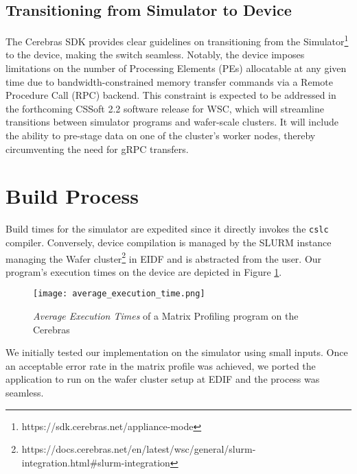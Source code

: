 \subsection{Transitioning from Simulator to Device}

The Cerebras SDK provides clear guidelines on transitioning from the Simulator\footnote{https://sdk.cerebras.net/appliance-mode} to the device, making the switch seamless. Notably, the device imposes limitations on the number of Processing Elements (PEs) allocatable at any given time due to bandwidth-constrained memory transfer commands via a Remote Procedure Call (RPC) backend. This constraint is expected to be addressed in the forthcoming CSSoft 2.2 software release for WSC, which will streamline transitions between simulator programs and wafer-scale clusters. It will include the ability to pre-stage data on one of the cluster's worker nodes, thereby circumventing the need for gRPC transfers.

\section{Build Process}

Build times for the simulator are expedited since it directly invokes the \texttt{cslc} compiler. Conversely, device compilation is managed by the SLURM instance managing the Wafer cluster\footnote{https://docs.cerebras.net/en/latest/wsc/general/slurm-integration.html\#slurm-integration} in EIDF and is abstracted from the user. Our program's execution times on the device are depicted in Figure \ref{fig:average_execution_time}.

\begin{figure}[h!]
    \texttt{[image: average\_execution\_time.png]}
    \centering
    \caption{\textit{Average Execution Times} of a Matrix Profiling program on the Cerebras}
    \label{fig:average_execution_time}
\end{figure}

We initially tested our implementation on the simulator using small inputs. Once an acceptable error rate in the matrix profile was achieved, we ported the application to run on the wafer cluster setup at EDIF and the process was seamless.
